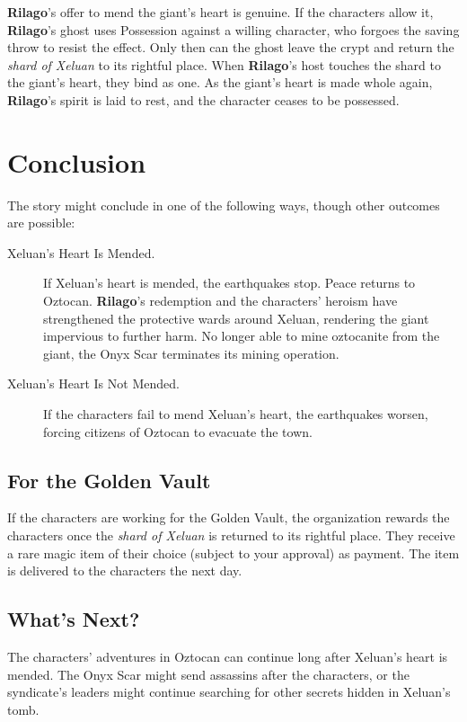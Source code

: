 \documentclass[10pt,a4paper,twoside,bg=print,twocolumn,openany,nodeprecatedcode]{dndbook}
\begin{document}
\textbf{Rilago}'s offer to mend the giant's heart is genuine. If the characters allow it, \textbf{Rilago}'s ghost uses Possession against a willing character, who forgoes the saving throw to resist the effect. Only then can the ghost leave the crypt and return the \textit{shard of Xeluan} to its rightful place. When \textbf{Rilago}'s host touches the shard to the giant's heart, they bind as one. As the giant's heart is made whole again, \textbf{Rilago}'s spirit is laid to rest, and the character ceases to be possessed.

\section{Conclusion}
The story might conclude in one of the following ways, though other outcomes are possible:


\begin{description}
\item[Xeluan's Heart Is Mended.]
If Xeluan's heart is mended, the earthquakes stop. Peace returns to Oztocan. \textbf{Rilago}'s redemption and the characters' heroism have strengthened the protective wards around Xeluan, rendering the giant impervious to further harm. No longer able to mine oztocanite from the giant, the Onyx Scar terminates its mining operation.
\item[Xeluan's Heart Is Not Mended.]
If the characters fail to mend Xeluan's heart, the earthquakes worsen, forcing citizens of Oztocan to evacuate the town.
\end{description}

\subsection{For the Golden Vault}
If the characters are working for the Golden Vault, the organization rewards the characters once the \textit{shard of Xeluan} is returned to its rightful place. They receive a rare magic item of their choice (subject to your approval) as payment. The item is delivered to the characters the next day.

\subsection{What's Next?}
The characters' adventures in Oztocan can continue long after Xeluan's heart is mended. The Onyx Scar might send assassins after the characters, or the syndicate's leaders might continue searching for other secrets hidden in Xeluan's tomb.
\end{document}

